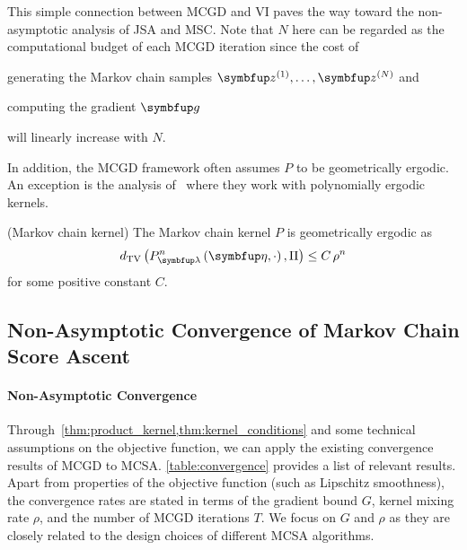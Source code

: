 \vspace{0.07in}


This simple connection between MCGD and VI paves the way toward the non-asymptotic analysis of JSA and MSC.
Note that \(N\) here can be regarded as the computational budget of each MCGD iteration since the cost of
\begin{enumerate*}[label=\textbf{(\roman*)}]
  \item generating the Markov chain samples \(\vz^{(1)}, \ldots, \vz^{(N)}\) and
  \item computing the gradient \(\vg\)
\end{enumerate*}
will linearly increase with \(N\).

In addition, the MCGD framework often assumes \(P\) to be geometrically ergodic.
An exception is the analysis of~\citet{debavelaere_convergence_2021} where they work with polynomially ergodic kernels.
\begin{assumption}{(Markov chain kernel)}\label{thm:kernel_conditions}
\vspace{-0.05in}
  The Markov chain kernel \(P\) is geometrically ergodic as
  {%
  \[
  \DTV{P_{\vlambda}^{n}\left(\veta, \cdot\right)}{ \Pi } \leq C \, \rho^{n}
  \]
  }
  for some positive constant \(C\).
\end{assumption}


\vspace{-0.07in}
\subsection{Non-Asymptotic Convergence of Markov Chain Score Ascent}%
\vspace{-0.05in}
\paragraph{Non-Asymptotic Convergence}
Through~\cref{thm:product_kernel,thm:kernel_conditions} and some technical assumptions on the objective function, we can apply the existing convergence results of MCGD to MCSA.
\cref{table:convergence} provides a list of relevant results.
Apart from properties of the objective function (such as Lipschitz smoothness), the convergence rates are stated in terms of the gradient bound \(G\), kernel mixing rate \(\rho\), and the number of MCGD iterations \(T\).
We focus on \(G\) and \(\rho\) as they are closely related to the design choices of different MCSA algorithms.

